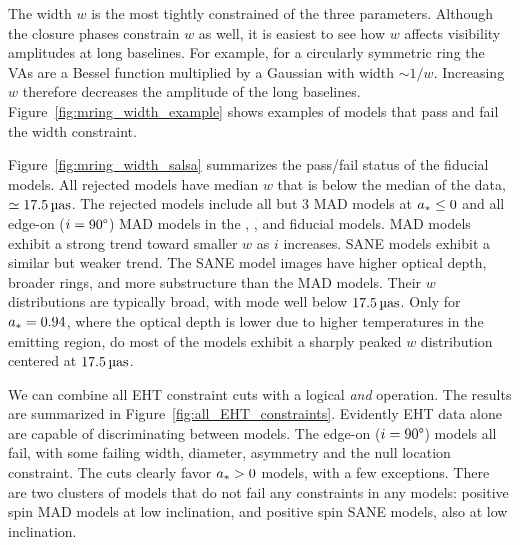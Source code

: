 
The \mring width $w$ is the most tightly constrained of the three \mring parameters.
Although the closure phases constrain $w$ as well, it is easiest to see how $w$ affects visibility amplitudes at long baselines.
For example, for a circularly symmetric ring the VAs are a Bessel function multiplied by a Gaussian with width $\sim 1/w$.  Increasing $w$ therefore decreases the amplitude of the long baselines.
Figure~\ref{fig:mring_width_example} shows examples of models that pass and fail the \mring width constraint.

Figure~\ref{fig:mring_width_salsa} summarizes the \mring  pass/fail status of the fiducial models.
All rejected models have median $w$ that is below the median of the data, $ \simeq 17.5\uas$.
The rejected models include all but 3 MAD models at $a_* \le 0$ and all edge-on ($i = 90\degree$) MAD models in the  \kharma, \bhac, and \hamr fiducial models.
MAD models exhibit a strong trend toward smaller $w$ as $i$ increases.
SANE models exhibit a similar but weaker trend.
The SANE model images have  higher optical depth, broader rings, and more substructure than the MAD models.
Their $w$ distributions are typically broad, with mode well below $17.5\uas$.
Only for $a_* = 0.94$, where the optical depth is lower due to higher temperatures in the emitting region, do most of the models exhibit a sharply peaked $w$ distribution centered at $17.5\uas$.


We can combine all EHT constraint cuts with a logical {\em and} operation.
The results are summarized in Figure~\ref{fig:all_EHT_constraints}.
Evidently EHT data alone are capable of discriminating between models.
The edge-on ($i = 90\degree$) models all fail, with some failing \mring width, diameter, asymmetry and the null location constraint.
The cuts clearly favor $a_* > 0$ models, with a few exceptions.
There are two clusters of models that do not fail any constraints in any models: positive spin MAD models at low inclination, and positive spin SANE models, also at low inclination.

